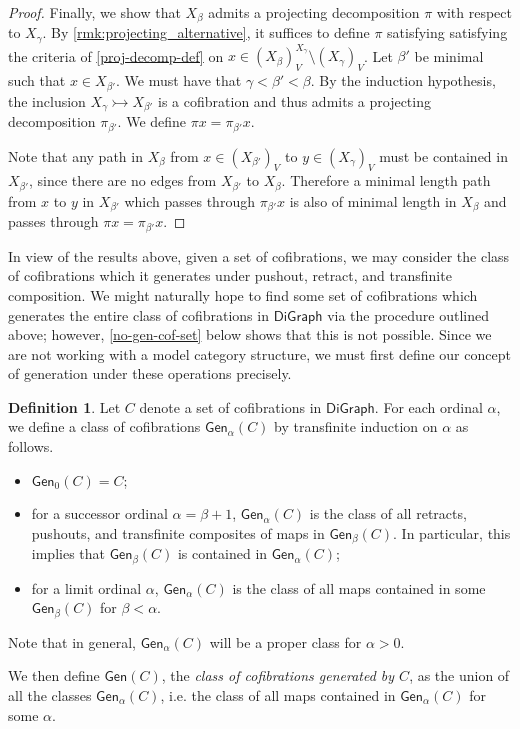 \documentclass[11pt]{article}
\theoremstyle{definition}
\newtheorem{defi}[theo]{Definition}
\numberwithin{equation}{section}
\newcommand{\DiGraph}{\mathsf{DiGraph}}
\newcommand{\Gen}{\mathsf{Gen}}
\newcommand{\cto}{\rightarrowtail}
\begin{document}
\begin{proof}
Finally, we show that $X_\beta$ admits a projecting decomposition $\pi$ with respect to $X_\gamma$. By \cref{rmk:projecting_alternative}, it suffices to define $\pi$ satisfying satisfying the criteria of \cref{proj-decomp-def} on $x \in (X_\beta)^{X_{\gamma}}_V \setminus (X_{\gamma})_V$. Let $\beta'$ be minimal such that $x\in X_{\beta'}$. We must have that $\gamma < \beta' < \beta$. By the induction hypothesis, the inclusion $X_\gamma \cto X_{\beta'}$ is a cofibration and thus admits a projecting decomposition $\pi_{\beta'}$. We define $\pi x = \pi_{\beta'} x$.

Note that any path in $X_\beta$ from $x \in (X_{\beta'})_V$ to $y\in (X_\gamma)_V$ must be contained in $X_{\beta'}$, since there are no edges from $X_{\beta'}$ to $ X_{\beta}$. Therefore a minimal length path from $x$ to $y$ in $X_{\beta'}$ which passes through $\pi_{\beta'}x$ is also of minimal length in $X_\beta$ and passes through $\pi x=\pi_{\beta'}x$.
\end{proof}

In view of the results above, given a set of cofibrations, we may consider the class of cofibrations which it generates under pushout, retract, and transfinite composition. 
We might naturally hope to find some set of cofibrations which generates the entire class of cofibrations in $\DiGraph$ via the procedure outlined above; however, \cref{no-gen-cof-set} below shows that this is not possible.
Since we are not working with a model category structure, we must first define our concept of generation under these operations precisely.

\begin{defi}
Let $C$ denote a set of cofibrations in $\DiGraph$. For each ordinal $\alpha$, we define a class of cofibrations $\Gen_\alpha(C)$ by transfinite induction on $\alpha$ as follows.
\begin{itemize}
    \item $\Gen_0(C) = C$;
    \item for a successor ordinal $\alpha = \beta + 1$, $\Gen_\alpha(C)$ is the class of all retracts, pushouts, and transfinite composites of maps in $\Gen_\beta(C)$. In particular, this implies that $\Gen_\beta(C)$ is contained in $\Gen_\alpha(C)$;
    \item for a limit ordinal $\alpha$, $\Gen_\alpha(C)$ is the class of all maps contained in some $\Gen_\beta(C)$ for $\beta < \alpha$.
\end{itemize}
Note that in general, $\Gen_\alpha(C)$ will be a proper class for $\alpha > 0$.

We then define $\Gen(C)$, the \emph{class of cofibrations generated by $C$}, as the union of all the classes $\Gen_{\alpha}(C)$, i.e.  the class of all maps contained in $\Gen_\alpha(C)$ for some $\alpha$.
\end{defi}
\end{document}
